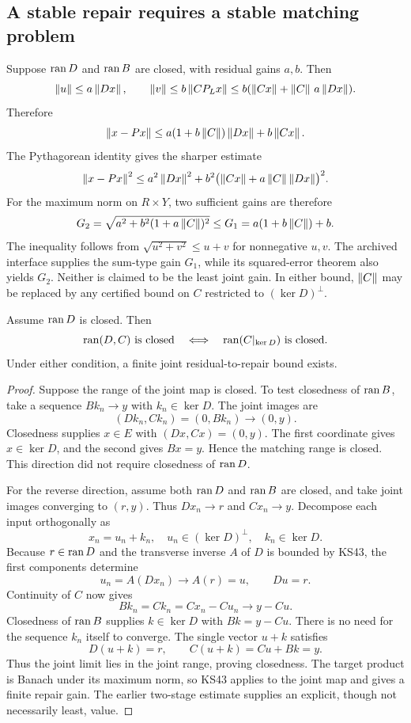 \subsection{A stable repair requires a stable matching problem}
Suppose \(\operatorname{ran} D\) and \(\operatorname{ran} B\) are closed, with residual gains \(a,b\). Then
\[
 \left\lVert u\right\rVert\le a\left\lVert Dx\right\rVert,\qquad
 \left\lVert v\right\rVert\le b\left\lVert CP_Lx\right\rVert
 \le b(\left\lVert Cx\right\rVert+\left\lVert C\right\rVert\,a\left\lVert Dx\right\rVert).
\]
Therefore
\begin{equation}\label{eq:jointgain}
 \left\lVert x-Px\right\rVert\le
 a(1+b\left\lVert C\right\rVert)\left\lVert Dx\right\rVert+b\left\lVert Cx\right\rVert.
\end{equation}
The Pythagorean identity gives the sharper estimate
\[
 \left\lVert x-Px\right\rVert^2\le
 a^2\left\lVert Dx\right\rVert^2+b^2\bigl(\left\lVert Cx\right\rVert+a\left\lVert C\right\rVert\left\lVert Dx\right\rVert\bigr)^2.
\]
For the maximum norm on \(R\times Y\), two sufficient gains are therefore
\[
 G_2=\sqrt{a^2+b^2(1+a\left\lVert C\right\rVert)^2}
 \le G_1=a(1+b\left\lVert C\right\rVert)+b.
\]
The inequality follows from \(\sqrt{u^2+v^2}\le u+v\) for nonnegative \(u,v\). The archived interface supplies the sum-type gain \(G_1\), while its squared-error theorem also yields \(G_2\). Neither is claimed to be the least joint gain. In either bound, \(\left\lVert C\right\rVert\) may be replaced by any certified bound on \(C\) restricted to \((\ker D)^\perp\).

\begin{theorem}\label{KS47}
Assume \(\operatorname{ran} D\) is closed. Then
\[
 \operatorname{ran}(D,C)\text{ is closed}\quad\Longleftrightarrow\quad
 \operatorname{ran}(C|_{\ker D})\text{ is closed}.
\]
Under either condition, a finite joint residual-to-repair bound exists.
\end{theorem}
\begin{proof}
Suppose the range of the joint map is closed. To test closedness of $\operatorname{ran} B$, take a sequence $Bk_n\to y$ with $k_n\in\ker D$. The joint images are
\[
 (Dk_n,Ck_n)=(0,Bk_n)\longrightarrow(0,y).
\]
Closedness supplies $x\in E$ with $(Dx,Cx)=(0,y)$. The first coordinate gives $x\in\ker D$, and the second gives $Bx=y$. Hence the matching range is closed. This direction did not require closedness of $\operatorname{ran} D$.

For the reverse direction, assume both $\operatorname{ran} D$ and $\operatorname{ran} B$ are closed, and take joint images converging to $(r,y)$. Thus $Dx_n\to r$ and $Cx_n\to y$. Decompose each input orthogonally as
\[
 x_n=u_n+k_n,\quad
 u_n\in(\ker D)^\perp,\quad k_n\in\ker D.
\]
Because $r\in\operatorname{ran} D$ and the transverse inverse $A$ of $D$ is bounded by KS43, the first components determine
\[
 u_n=A(Dx_n)\longrightarrow A(r)=u,
 \qquad Du=r.
\]
Continuity of $C$ now gives
\[
 Bk_n=Ck_n=Cx_n-Cu_n\longrightarrow y-Cu.
\]
Closedness of $\operatorname{ran} B$ supplies $k\in\ker D$ with $Bk=y-Cu$. There is no need for the sequence $k_n$ itself to converge. The single vector $u+k$ satisfies
\[
 D(u+k)=r,
 \qquad C(u+k)=Cu+Bk=y.
\]
Thus the joint limit lies in the joint range, proving closedness. The target product is Banach under its maximum norm, so KS43 applies to the joint map and gives a finite repair gain. The earlier two-stage estimate supplies an explicit, though not necessarily least, value.
\end{proof}



